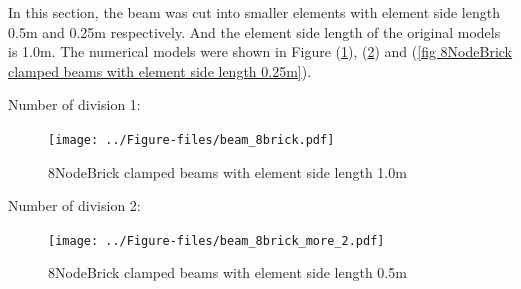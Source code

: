 \documentclass[fleqn,11pt]{article}
\begin{document}





% 




\newpage
In this section, the beam was cut into smaller elements with element side length 0.5m and 0.25m respectively. And the element side length of the original models is 1.0m. The numerical models were shown in Figure (\ref{fig 8NodeBrick clamped beams with element side length 1.0m}), (\ref{fig 8NodeBrick clamped beams with element side length 0.5m}) and (\ref{fig 8NodeBrick clamped beams with element side length 0.25m}). 

Number of division 1:

\begin{figure}[H]
  \centering
  \texttt{[image: ../Figure-files/beam\_8brick.pdf]}
  \caption{8NodeBrick clamped beams with element side length 1.0m}
  \label{fig 8NodeBrick clamped beams with element side length 1.0m}
\end{figure}

Number of division 2:

\begin{figure}[H]
  \centering
  \texttt{[image: ../Figure-files/beam\_8brick\_more\_2.pdf]}
  \caption{8NodeBrick clamped beams with element side length 0.5m}
  \label{fig 8NodeBrick clamped beams with element side length 0.5m}
\end{figure}
\end{document}
